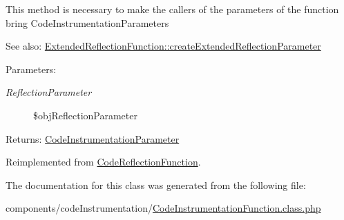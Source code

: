 This method is necessary to make the callers of the parameters of the function bring CodeInstrumentationParameters

\begin{Desc}
\item[See also:]\hyperlink{class_extended_reflection_function_de07ccd452e54a7c8878fc20d215831e}{ExtendedReflectionFunction::createExtendedReflectionParameter} \end{Desc}
\begin{Desc}
\item[Parameters:]
\begin{description}
\item[{\em ReflectionParameter}]\$objReflectionParameter \end{description}
\end{Desc}
\begin{Desc}
\item[Returns:]\hyperlink{class_code_instrumentation_parameter}{CodeInstrumentationParameter} \end{Desc}


Reimplemented from \hyperlink{class_code_reflection_function_7ce14d3f6e8579332f226d85fb439b80}{CodeReflectionFunction}.

The documentation for this class was generated from the following file:\begin{CompactItemize}
\item 
components/codeInstrumentation/\hyperlink{_code_instrumentation_function_8class_8php}{CodeInstrumentationFunction.class.php}\end{CompactItemize}
